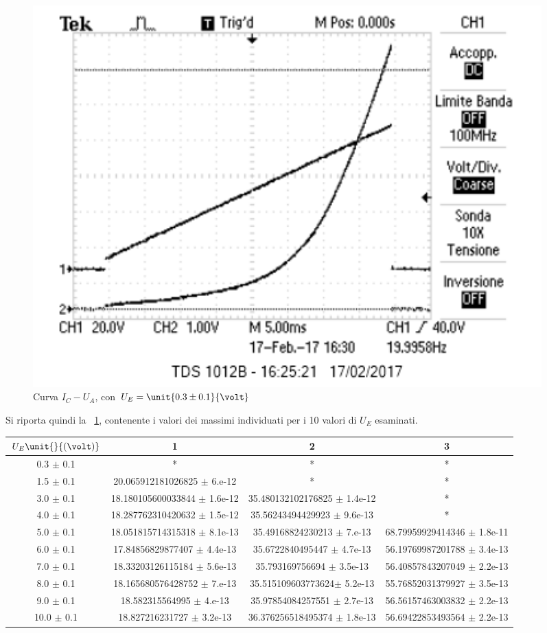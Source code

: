 \documentclass[10pt,a4paper]{article}
\begin{document}
\begin{figure}[H]
\begin{minipage}{0.55\textwidth}
		\includegraphics[width=0.95\textwidth]{../oscilloscopio/Task9_0.png}
		\caption{Curva $I_{C} - U_{A}$, con $U_E = \unit{0.3 \pm 0.1}{\volt}$}
		\label{fig:UEex3}
	\end{minipage}
\end{figure}

Si riporta quindi la \tablename{~\ref{tab:maxfit}}, contenente i valori dei massimi individuati per i 10 valori di $U_E$ esaminati.

\begin{table}[h!]
	\centering
	\begin{tabular}{c|c|c|c}
		\hline
		$U_E \unit{}{(\volt)}$ & 1 & 2 & 3 \\
		\hline 
		0.3 $\pm$ 0.1 & * & * & * \\
		1.5 $\pm$ 0.1 & 20.065912181026825 $\pm$ 6.e-12 & * & *  \\
		3.0 $\pm$ 0.1 & 18.180105600033844 $\pm$ 1.6e-12 & 35.480132102176825 $\pm$ 1.4e-12 & *  \\
		4.0 $\pm$ 0.1 & 18.287762310420632  $\pm$ 1.5e-12 & 35.56243494429923 $\pm$ 9.6e-13 & *  \\
		5.0 $\pm$ 0.1 & 18.051815714315318  $\pm$ 8.1e-13 & 35.49168824230213 $\pm$ 7.e-13& 68.79959929414346 $\pm$ 1.8e-11 \\
		6.0 $\pm$ 0.1 & 17.84856829877407   $\pm$ 4.4e-13 & 35.6722840495447 $\pm$ 4.7e-13 & 56.19769987201788 $\pm$ 3.4e-13\\
		7.0 $\pm$ 0.1 &18.33203126115184 $\pm$ 5.6e-13 & 35.793169756694 $\pm$ 3.5e-13 & 56.40857843207049 $\pm$ 2.2e-13 \\
		8.0 $\pm$ 0.1 & 18.165680576428752 $\pm$ 7.e-13 & 35.515109603773624$\pm$ 5.2e-13 & 55.76852031379927 $\pm$ 3.5e-13 \\
		9.0 $\pm$ 0.1 & 18.582315564995 $\pm$  4.e-13 & 35.97854084257551 $\pm$ 2.7e-13& 56.56157463003832 $\pm$ 2.2e-13 \\
		10.0 $\pm$ 0.1 & 18.827216231727 $\pm$ 3.2e-13 & 36.376256518495374 $\pm$ 1.8e-13& 56.69422853493564 $\pm$ 2.2e-13 \\
		\hline
	\end{tabular}
	\label{tab:maxfit}
\end{table}
\end{document}
